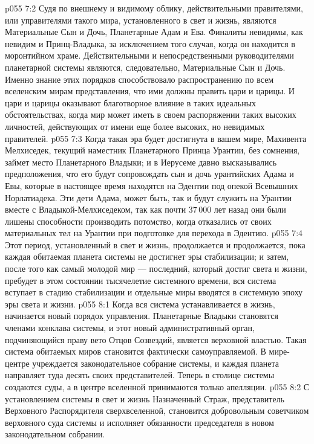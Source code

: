 \vs p055 7:2 Судя по внешнему и видимому облику, действительными правителями, или управителями такого мира, установленного в свет и жизнь, являются Материальные Сын и Дочь, Планетарные Адам и Ева. Финалиты невидимы, как невидим и Принц\hyp{}Владыка, за исключением того случая, когда он находится в моронтийном храме. Действительными и непосредственными руководителями планетарной системы являются, следовательно, Материальные Сын и Дочь. Именно знание этих порядков способствовало распространению по всем вселенским мирам представления, что ими должны править цари и царицы. И цари и царицы оказывают благотворное влияние в таких идеальных обстоятельствах, когда мир может иметь в своем распоряжении таких высоких личностей, действующих от имени еще более высоких, но невидимых правителей.
\vs p055 7:3 Когда такая эра будет достигнута в вашем мире, Махивента Мелхиседек, текущий наместник Планетарного Принца Урантии, без сомнения, займет место Планетарного Владыки; и в Иерусеме давно высказывались предположения, что его будут сопровождать сын и дочь урантийских Адама и Евы, которые в настоящее время находятся на Эдентии под опекой Всевышних Норлатиадека. Эти дети Адама, может быть, так и будут служить на Урантии вместе с Владыкой\hyp{}Мелхиседеком, так как почти 37\,000 лет назад они были лишены способности производить потомство, когда отказались от своих материальных тел на Урантии при подготовке для перехода в Эдентию.
\vs p055 7:4 \pc Этот период, установленный в свет и жизнь, продолжается и продолжается, пока каждая обитаемая планета системы не достигнет эры стабилизации; и затем, после того как самый молодой мир --- последний, который достиг света и жизни, пребудет в этом состоянии тысячелетие системного времени, вся система вступает в стадию стабилизации и отдельные миры вводятся в системную эпоху эры света и жизни.
\vs p055 8:1 Когда вся система устанавливается в жизнь, начинается новый порядок управления. Планетарные Владыки становятся членами конклава системы, и этот новый административный орган, подчиняющийся праву вето Отцов Созвездий, является верховной властью. Такая система обитаемых миров становится фактически самоуправляемой. В мире\hyp{}центре учреждается законодательное собрание системы, и каждая планета направляет туда десять своих представителей. Теперь в столице системы создаются суды, а в центре вселенной принимаются только апелляции.
\vs p055 8:2 С установлением системы в свет и жизнь Назначенный Страж, представитель Верховного Распорядителя сверхвселенной, становится добровольным советчиком верховного суда системы и исполняет обязанности председателя в новом законодательном собрании.
